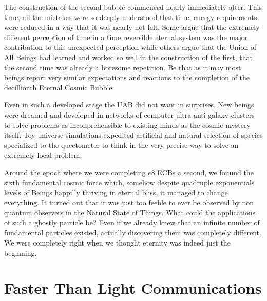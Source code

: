 \documentclass[]{article}
\begin{document}
	
	
	The construction of the second bubble commenced nearly immediately after. This time, all the mistakes were so deeply understood that time, energy requirements were reduced in a way that it was nearly not felt. Some argue that the extremely different perception of time in a time reversible eternal system was the major contribution to this unexpected perception while others argue that the Union of All Beings had learned and worked so well in the construction of the first, that the second time was already a boresome repetition. Be that as it may most beings report very similar expectations and reactions to the completion of the decillionth Eternal Cosmic Bubble.
	
	Even in such a developed stage the UAB did not want in surprises. New beings were dreamed and developed in networks of computer ultra anti galaxy clusters to solve problems as inconprehensible to existing minds as the cosmic mystery itself. Toy universe simulations expedited artificial and natural selection of species specialized to the quectometer to think in the very precise way to solve an extremely local problem.
	
	Around the epoch where we were completing $e8$ ECBs a second, we fouund the sixth fundamental cosmic force which, somehow despite quadruple exponentials levels of Beings happilly thriving in eternal bliss, it managed to change everything. It turned out that it was just too feeble to ever be observed by non quantum observers in the Natural State of Things. What could the applications of such a ghostly particle be? Even if we already knew that an infinite number of fundamental particles existed, actually discovering them was completely different. We were completely right when we thought eternity was indeed just the beginning.
	
	\section{Faster Than Light Communications}
	
	
	
	
\end{document}
